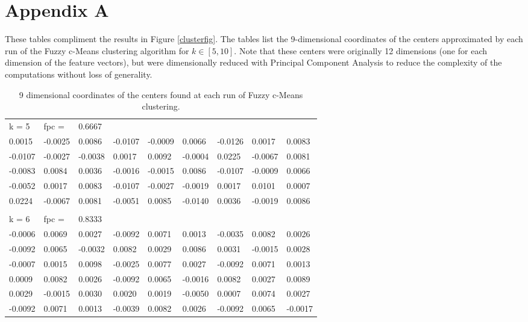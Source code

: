 \documentclass[letterpaper, 12pt]{article}
\begin{document}
\pagebreak
\section{Appendix A}
These tables compliment the results in Figure \ref{clusterfig}. The tables list the 9-dimensional coordinates of the centers approximated by each run of the Fuzzy c-Means clustering algorithm for $k \in [5,10]$. Note that these centers were originally 12 dimensions (one for each dimension of the feature vectors), but were dimensionally reduced with Principal Component Analysis to reduce the complexity of the computations without loss of generality. 

\begin{table}[h]
\centering
\caption{9 dimensional coordinates of the centers found at each run of Fuzzy c-Means clustering.}
\label{tablecenters}
\begin{tabular}{lllllllll}
k = 5   & fpc =   & 0.6667  &         &         &         &         &         &         \\
0.0015  & -0.0025 & 0.0086  & -0.0107 & -0.0009 & 0.0066  & -0.0126 & 0.0017  & 0.0083  \\
-0.0107 & -0.0027 & -0.0038 & 0.0017  & 0.0092  & -0.0004 & 0.0225  & -0.0067 & 0.0081  \\
-0.0083 & 0.0084  & 0.0036  & -0.0016 & -0.0015 & 0.0086  & -0.0107 & -0.0009 & 0.0066  \\
-0.0052 & 0.0017  & 0.0083  & -0.0107 & -0.0027 & -0.0019 & 0.0017  & 0.0101  & 0.0007  \\
0.0224  & -0.0067 & 0.0081  & -0.0051 & 0.0085  & -0.0140 & 0.0036  & -0.0019 & 0.0086  \\
        &         &         &         &         &         &         &         &         \\
k = 6   & fpc =   & 0.8333  &         &         &         &         &         &         \\
-0.0006 & 0.0069  & 0.0027  & -0.0092 & 0.0071  & 0.0013  & -0.0035 & 0.0082  & 0.0026  \\
-0.0092 & 0.0065  & -0.0032 & 0.0082  & 0.0029  & 0.0086  & 0.0031  & -0.0015 & 0.0028  \\
-0.0007 & 0.0015  & 0.0098  & -0.0025 & 0.0077  & 0.0027  & -0.0092 & 0.0071  & 0.0013  \\
0.0009  & 0.0082  & 0.0026  & -0.0092 & 0.0065  & -0.0016 & 0.0082  & 0.0027  & 0.0089  \\
0.0029  & -0.0015 & 0.0030  & 0.0020  & 0.0019  & -0.0050 & 0.0007  & 0.0074  & 0.0027  \\
-0.0092 & 0.0071  & 0.0013  & -0.0039 & 0.0082  & 0.0026  & -0.0092 & 0.0065  & -0.0017 \\


\end{tabular}
\end{table}
\end{document}

